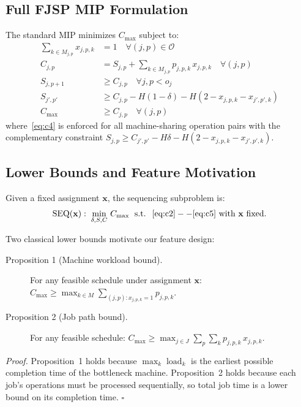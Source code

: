 \documentclass[conference]{IEEEtran}
\begin{document}
\subsection{Full FJSP MIP Formulation}
The standard MIP minimizes $C_{\max}$ subject to:
\begin{align}
\sum_{k\in M_{j,p}} x_{j,p,k} &= 1 \quad \forall (j,p)\in\mathcal{O} \label{eq:c1}\\
C_{j,p} &= S_{j,p} + \sum_{k\in M_{j,p}} p_{j,p,k}\,x_{j,p,k} \quad \forall (j,p) \label{eq:c2}\\
S_{j,p+1} &\geq C_{j,p} \quad \forall j, p< o_j \label{eq:c3}\\
S_{j',p'} &\geq C_{j,p} - H(1-\delta) - H(2-x_{j,p,k}-x_{j',p',k}) \label{eq:c4}\\
C_{\max} &\geq C_{j,p} \quad \forall (j,p) \label{eq:c5}
\end{align}
where~\eqref{eq:c4} is enforced for all machine-sharing operation pairs with the complementary constraint $S_{j,p} \geq C_{j',p'} - H\delta - H(2-x_{j,p,k}-x_{j',p',k})$.

\subsection{Lower Bounds and Feature Motivation}
Given a fixed assignment $\mathbf{x}$, the sequencing subproblem is:
\begin{equation}
\operatorname{SEQ}(\mathbf{x}):\; \min_{\delta,S,C}\, C_{\max}\;\text{ s.t. }\;\eqref{eq:c2}--\eqref{eq:c5}\text{ with }\mathbf{x}\text{ fixed}. \label{eq:seq}
\end{equation}

Two classical lower bounds motivate our feature design:

\begin{description}
\item[Proposition 1 (Machine workload bound).] For any feasible schedule under assignment $\mathbf{x}$: 
$C_{\max} \geq \max_{k\in M} \sum_{(j,p):x_{j,p,k}=1} p_{j,p,k}$.
\item[Proposition 2 (Job path bound).] For any feasible schedule: 
$C_{\max} \geq \max_{j\in J} \sum_{p} \sum_{k} p_{j,p,k}\,x_{j,p,k}$.
\end{description}

\textit{Proof.} Proposition~1 holds because $\max_k \operatorname{load}_k$ is the earliest possible completion time of the bottleneck machine. Proposition~2 holds because each job's operations must be processed sequentially, so total job time is a lower bound on its completion time. $\square$
\end{document}
